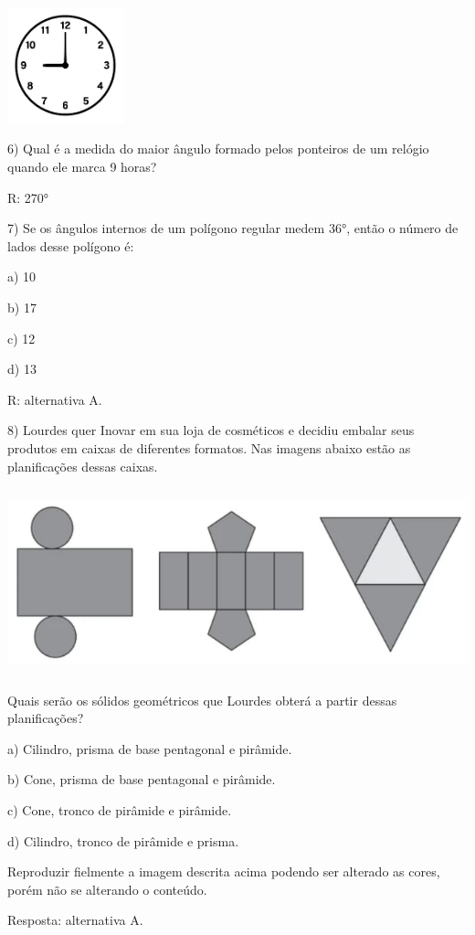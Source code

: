 \includegraphics[width=1.32083in,height=1.32083in]{./imgSAEB_6_MAT/media/image50.jpeg}

6) Qual é a medida do maior ângulo formado pelos ponteiros de um relógio
quando ele marca 9 horas?

R: 270°

7) Se os ângulos internos de um polígono regular medem 36°, então o
número de lados desse polígono é:

a) 10

b) 17

c) 12

d) 13

R: alternativa A.

8) Lourdes quer Inovar em sua loja de cosméticos e decidiu embalar seus
produtos em caixas de diferentes formatos. Nas imagens abaixo estão as
planificações dessas caixas.

\includegraphics[width=5.90625in,height=2.125in]{./imgSAEB_6_MAT/media/image51.png}

Quais serão os sólidos geométricos que Lourdes obterá a partir dessas
planificações?

a) Cilindro, prisma de base pentagonal e pirâmide.

b) Cone, prisma de base pentagonal e pirâmide.

c) Cone, tronco de pirâmide e pirâmide.

d) Cilindro, tronco de pirâmide e prisma.

Reproduzir fielmente a imagem descrita acima podendo ser alterado as
cores, porém não se alterando o conteúdo.

Resposta: alternativa A.

